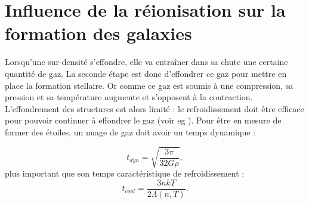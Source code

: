 

\section{Influence de la réionisation sur la formation des galaxies}

Lorsqu'une sur-densité s’effondre, elle va entraîner dans sa chute une certaine quantité de gaz.
La seconde étape est donc d’effondrer ce gaz pour mettre en place la formation stellaire.
Or comme ce gaz est soumis à une compression, sa pression et sa température augmente et s'opposent à la contraction.
L'effondrement des structures est alors limité : le refroidissement doit être efficace pour pouvoir continuer à effondrer le gaz (voir eg \cite{2004ARA&A..42...79B}).
Pour être en mesure de former des étoiles, un nuage de gaz doit avoir un temps dynamique :

\begin{equation}
t_{dyn} =\sqrt{\frac{3 \pi}{32 G \rho}},
\end{equation}
plus important que son temps caractéristique de refroidissement :
\begin{equation}
t_{cool} = \frac{3 nkT}{2 \Lambda(n,T)}.
\end{equation}


